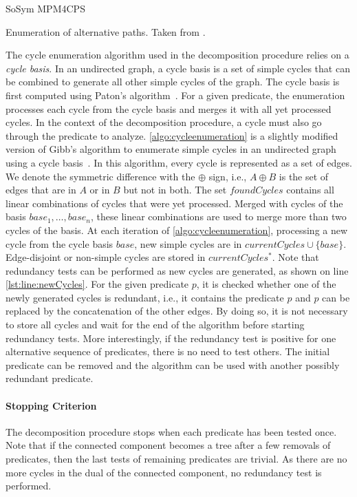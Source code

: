 \begin{copiedFrom}{SoSym MPM4CPS}
\begin{algorithm}
    
    \caption[Enumeration of alternative paths]{Enumeration of alternative paths. Taken from .}
    \label{algo:cycleenumeration}
\end{algorithm}

The cycle enumeration algorithm used in the decomposition procedure relies on a \textit{cycle basis}. In an undirected graph, a cycle basis is a set of simple cycles that can be combined to generate all other simple cycles of the graph. The cycle basis is first computed using Paton's algorithm~\cite{paton1969algorithm}. For a given predicate, the enumeration processes each cycle from the cycle basis and merges it with all yet processed cycles. In the context of the decomposition procedure, a cycle must also go through the predicate to analyze. \autoref{algo:cycleenumeration} is a slightly modified version of Gibb's algorithm to enumerate simple cycles in an undirected graph using a cycle basis~\cite{gibbs1969cycle}. In this algorithm, every cycle is represented as a set of edges. We denote the symmetric difference with the $\oplus$ sign, i.e., $A \oplus B$ is the set of edges that are in $A$ or in $B$ but not in both. The set $foundCycles$ contains all linear combinations of cycles that were yet processed. Merged with cycles of the basis $base_1, \dots, base_n$, these linear combinations are used to merge more than two cycles of the basis. At each iteration of \autoref{algo:cycleenumeration}, processing a new cycle from the cycle basis $base$, new simple cycles are in $currentCycles \cup \{base\}$. Edge-disjoint or non-simple cycles are stored in $currentCycles^*$. Note that redundancy tests can be performed as new cycles are generated, as shown on line \ref{lst:line:newCycles}. For the given predicate $p$, it is checked whether one of the newly generated cycles is redundant, i.e., it contains the predicate $p$ and $p$ can be replaced by the concatenation of the other edges. By doing so, it is not necessary to store all cycles and wait for the end of the algorithm before starting redundancy tests. More interestingly, if the redundancy test is positive for one alternative sequence of predicates, there is no need to test others. The initial predicate can be removed and the algorithm can be used with another possibly redundant predicate.
  
\paragraph{Stopping Criterion}
The decomposition procedure stops when each predicate has been tested once. Note that if the connected component becomes a tree after a few removals of predicates, then the last tests of remaining predicates are trivial. As there are no more cycles in the dual of the connected component, no redundancy test is performed.


\end{copiedFrom}
